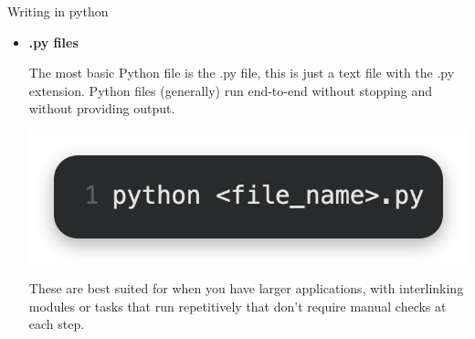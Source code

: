 \documentclass[aspectratio=169]{beamer}
\begin{document}
\begin{frame}{Writing in python}
	\begin{itemize}
		\item \textbf{.py files}
		
		The most basic Python file is the .py file, this is just a text file with the .py extension. Python files (generally) run end-to-end without stopping and without providing output. 
		
		\includegraphics[scale=0.5]{graphics/run_python_file.png}
		
		These are best suited for when you have larger applications, with interlinking modules or tasks that run repetitively that don't require manual checks at each step. 
			
	\end{itemize}
\end{frame}
\end{document}
